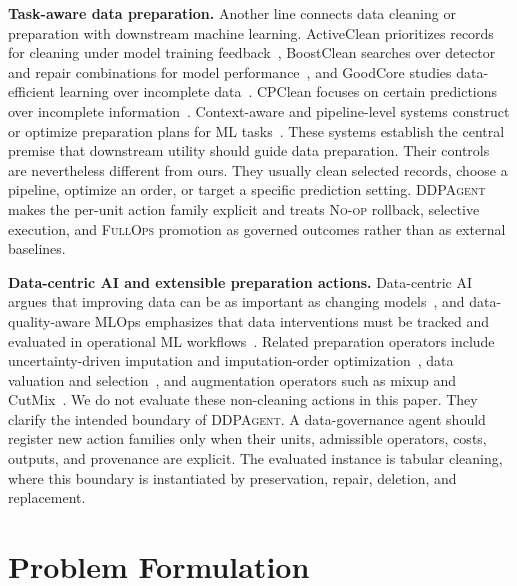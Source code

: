 \documentclass[sigconf, nonacm]{acmart}
\newcommand{\sys}{\textsc{DDPAgent}\xspace}
\newcommand{\noop}{\textsc{No-op}\xspace}
\newcommand{\fullops}{\textsc{FullOps}\xspace}
\begin{document}
\textbf{Task-aware data preparation.}
Another line connects data cleaning or preparation with downstream machine learning. ActiveClean prioritizes records for cleaning under model training feedback~\cite{krishnan2016activeclean}, BoostClean searches over detector and repair combinations for model performance~\cite{krishnan2017boostclean}, and GoodCore studies data-efficient learning over incomplete data~\cite{goodcore}. CPClean focuses on certain predictions over incomplete information~\cite{karlas2020cpclean}. Context-aware and pipeline-level systems construct or optimize preparation plans for ML tasks~\cite{ctxpipe2024,siddiqi2024saga,mohammed2025stepbystep}. These systems establish the central premise that downstream utility should guide data preparation. Their controls are nevertheless different from ours. They usually clean selected records, choose a pipeline, optimize an order, or target a specific prediction setting. \sys makes the per-unit action family explicit and treats \noop rollback, selective execution, and \fullops promotion as governed outcomes rather than as external baselines.

\textbf{Data-centric AI and extensible preparation actions.}
Data-centric AI argues that improving data can be as important as changing models~\cite{jarrahi2023datacentric,jakubik2024datacentric}, and data-quality-aware MLOps emphasizes that data interventions must be tracked and evaluated in operational ML workflows~\cite{renggli2020snoopy}. Related preparation operators include uncertainty-driven imputation and imputation-order optimization~\cite{wang2024nomi,zhang2025thinktwice}, data valuation and selection~\cite{loizou2025cdash,zhang2025diversity}, and augmentation operators such as mixup and CutMix~\cite{zhang2018mixup,yun2019cutmix}. We do not evaluate these non-cleaning actions in this paper. They clarify the intended boundary of \sys. A data-governance agent should register new action families only when their units, admissible operators, costs, outputs, and provenance are explicit. The evaluated instance is tabular cleaning, where this boundary is instantiated by preservation, repair, deletion, and replacement.

\section{Problem Formulation}
\label{sec:problem}
\end{document}
